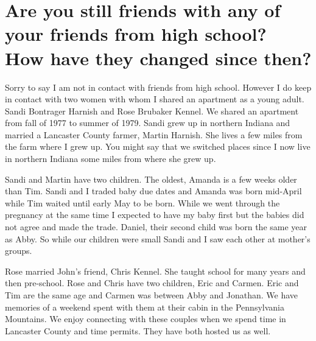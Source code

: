 \section{Are you still friends with any of your friends from high school? How have they changed since then?}
Sorry to say I am not in contact with friends from high school.
However I do keep in contact with two women with whom I shared an apartment as a young adult.
Sandi Bontrager Harnish and Rose Brubaker Kennel.
We shared an apartment from fall of 1977 to summer of 1979.
Sandi grew up in northern Indiana and married a Lancaster County farmer, Martin Harnish.
She lives a few miles from the farm where I grew up.
You might say that we switched places since I now live in northern Indiana some miles from where she grew up.

Sandi and Martin have two children.
The oldest, Amanda is a few weeks older than Tim.
Sandi and I traded baby due dates and Amanda was born mid-April while Tim waited until early May to be born.
While we went through the pregnancy at the same time I expected to have my baby first but the babies did not agree and made the trade.
Daniel, their second child was born the same year as Abby.
So while our children were small Sandi and I saw each other at mother's groups.

Rose married John's friend, Chris Kennel.
She taught school for many years and then pre-school.
Rose and Chris have two children, Eric and Carmen.
Eric and Tim are the same age and Carmen was between Abby and Jonathan.
We have memories of a weekend spent with them at their cabin in the Pennsylvania Mountains.
We enjoy connecting with these couples when we spend time in Lancaster County and time permits.
They have both hosted us as well.







